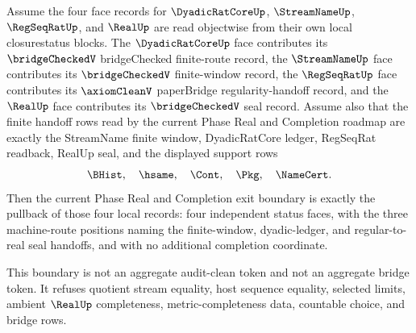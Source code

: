 \begin{theorem}
\label{thm:streamname-four-face-local-record-exit-boundary}
Assume the four face records for $\DyadicRatCoreUp$, $\StreamNameUp$, $\RegSeqRatUp$, and $\RealUp$ are read objectwise from their own local closurestatus blocks. The $\DyadicRatCoreUp$ face contributes its $\bridgeCheckedV$ bridgeChecked finite-route record, the $\StreamNameUp$ face contributes its $\bridgeCheckedV$ finite-window record, the $\RegSeqRatUp$ face contributes its $\axiomCleanV$ paperBridge regularity-handoff record, and the $\RealUp$ face contributes its $\bridgeCheckedV$ seal record. Assume also that the finite handoff rows read by the current Phase Real and Completion roadmap are exactly the StreamName finite window, DyadicRatCore ledger, RegSeqRat readback, RealUp seal, and the displayed support rows
$$
\BHist,\quad \hsame,\quad \Cont,\quad \Pkg,\quad \NameCert.
$$
Then the current Phase Real and Completion exit boundary is exactly the pullback of those four local records: four independent status faces, with the three machine-route positions naming the finite-window, dyadic-ledger, and regular-to-real seal handoffs, and with no additional completion coordinate.

This boundary is not an aggregate audit-clean token and not an aggregate bridge token. It refuses quotient stream equality, host sequence equality, selected limits, ambient $\RealUp$ completeness, metric-completeness data, countable choice, and bridge rows.
\end{theorem}
